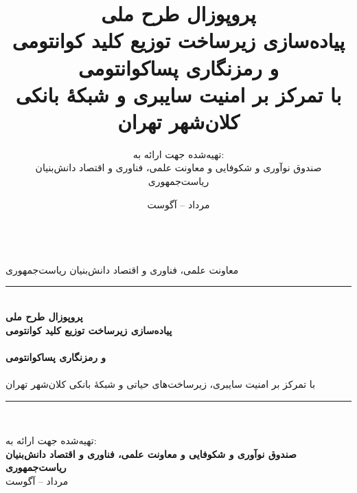 \documentclass[12pt,a4paper]{report}
\title{\textbf{\Huge پروپوزال طرح ملی\\[6pt]
پیاده‌سازی زیرساخت توزیع کلید کوانتومی \lr{(QKD)}\\
و رمزنگاری پساکوانتومی \lr{(PQC)}\\[4pt]
\Large با تمرکز بر امنیت سایبری و شبکهٔ بانکی کلان‌شهر تهران}}
\author{تهیه‌شده جهت ارائه به: \\ صندوق نوآوری و شکوفایی و معاونت علمی، فناوری و اقتصاد دانش‌بنیان ریاست‌جمهوری}
\date{مرداد \lr{1405} -- آگوست \lr{2026}}
\theoremstyle{plain}
\begin{document}
\begin{titlepage}
\centering
\vspace*{1cm}
{\large {}}\\[0.3cm]
{\large معاونت علمی، فناوری و اقتصاد دانش‌بنیان ریاست‌جمهوری}\\[1.7cm]

\rule{\linewidth}{1pt}\\[0.6cm]
{\Huge \bfseries \color{navydeep} پروپوزال طرح ملی}\\[0.4cm]
{\huge \bfseries پیاده‌سازی زیرساخت توزیع کلید کوانتومی}\\[0.2cm]
{\Large {}}\\[0.5cm]
{\huge \bfseries و رمزنگاری پساکوانتومی}\\[0.2cm]
{\Large {}}\\[0.6cm]
{\large با تمرکز بر امنیت سایبری، زیرساخت‌های حیاتی و شبکهٔ بانکی کلان‌شهر تهران}\\[0.6cm]
\rule{\linewidth}{1pt}\\[2cm]


\vfill

{\large تهیه‌شده جهت ارائه به:}\\
{\large \bfseries صندوق نوآوری و شکوفایی و معاونت علمی، فناوری و اقتصاد دانش‌بنیان ریاست‌جمهوری}\\[1cm]
{\large مرداد  -- آگوست }
\vspace{1cm}
\end{titlepage}


\clearpage
\tableofcontents
\clearpage
{}


















\end{document}
